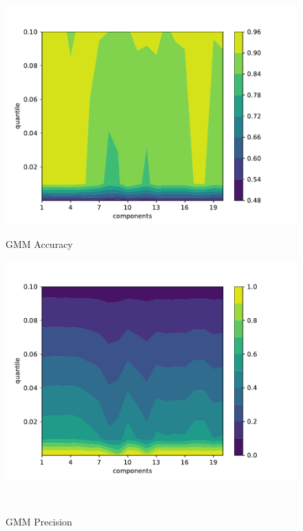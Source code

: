 \begin{figure}[H] %
    \begin{minipage}[t]{0.5\textwidth}
        \vspace{0pt}
        \includegraphics[width=\textwidth]{images/gmm-accuracy.pdf}
        \caption{GMM Accuracy}
    \end{minipage}
    \hfill
    \begin{minipage}[t]{0.5\textwidth}
        \vspace{0pt}
        \includegraphics[width=\textwidth]{images/gmm-precision.pdf}
        \caption{GMM Precision}
    \end{minipage}
    \\

\end{figure}

